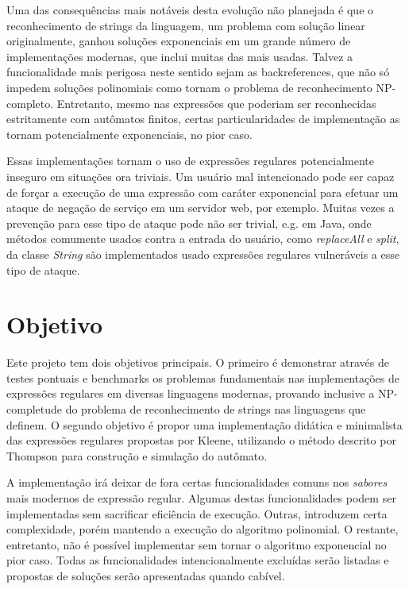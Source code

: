 \documentclass[a4paper,12pt,oneside,onecolumn]{uerj}
\begin{document}
Uma das consequências mais notáveis desta evolução não planejada é que o reconhecimento de strings da linguagem, um problema com solução linear originalmente, ganhou soluções exponenciais em um grande número de implementações modernas, que inclui muitas das mais usadas. Talvez a funcionalidade mais perigosa neste sentido sejam as backreferences, que não só impedem soluções polinomiais como tornam o problema de reconhecimento NP-completo. Entretanto, mesmo nas expressões que poderiam ser reconhecidas estritamente com autômatos finitos, certas particularidades de implementação as tornam potencialmente exponenciais, no pior caso. \cite{bib:Cox07}

Essas implementações tornam o uso de expressões regulares potencialmente inseguro em situações ora triviais. Um usuário mal intencionado pode ser capaz de forçar a execução de uma expressão com caráter exponencial para efetuar um ataque de negação de serviço em um servidor web, por exemplo. Muitas vezes a prevenção para esse tipo de ataque pode não ser trivial, e.g. em Java, onde métodos comumente usados contra a entrada do usuário, como \emph{replaceAll} e \emph{split}, da classe \emph{String} são implementados usado expressões regulares vulneráveis a esse tipo de ataque.

\section{Objetivo}

Este projeto tem dois objetivos principais. O primeiro é demonstrar através de testes pontuais e benchmarks os problemas fundamentais nas implementações de expressões regulares em diversas linguagens modernas, provando inclusive a NP-completude do problema de reconhecimento de strings nas linguagens que definem. O segundo objetivo é propor uma implementação didática e minimalista das expressões regulares propostas por Kleene, utilizando o método descrito por Thompson para construção e simulação do autômato. 

A implementação irá deixar de fora certas funcionalidades comuns nos \emph{sabores} mais modernos de expressão regular. Algumas destas funcionalidades podem ser implementadas sem sacrificar eficiência de execução. Outras, introduzem certa complexidade, porém mantendo a execução do algoritmo polinomial. O restante, entretanto, não é possível implementar sem tornar o algoritmo exponencial no pior caso. Todas as funcionalidades intencionalmente excluídas serão listadas e propostas de soluções serão apresentadas quando cabível.
\end{document}
